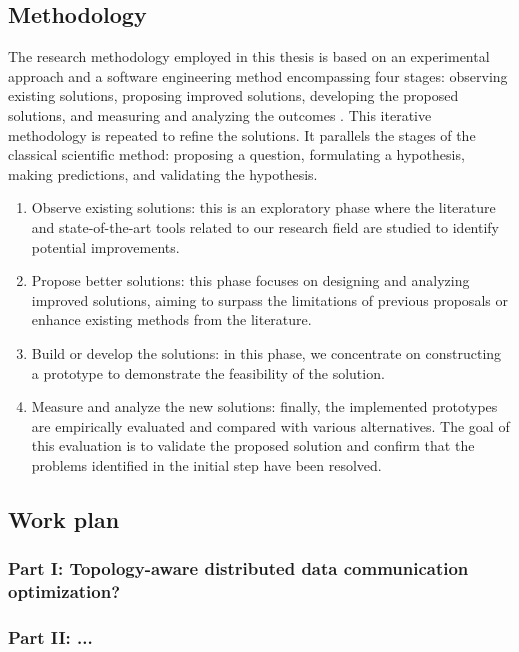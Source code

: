 \documentclass[a4paper, 11pt]{article}
\begin{document}
\subsection{Methodology}
The research methodology employed in this thesis is based on an experimental approach and a software engineering method encompassing four stages: observing existing solutions, proposing improved solutions, developing the proposed solutions, and measuring and analyzing the outcomes \cite{adrion1993research}. This iterative methodology is repeated to refine the solutions. It parallels the stages of the classical scientific method: proposing a question, formulating a hypothesis, making predictions, and validating the hypothesis.

\begin{enumerate}
    \item Observe existing solutions: this is an exploratory phase where the literature and state-of-the-art tools related to our research field are studied to identify potential improvements.
    \item Propose better solutions: this phase focuses on designing and analyzing improved solutions, aiming to surpass the limitations of previous proposals or enhance existing methods from the literature.
    \item Build or develop the solutions: in this phase, we concentrate on constructing a prototype to demonstrate the feasibility of the solution.
    \item Measure and analyze the new solutions: finally, the implemented prototypes are empirically evaluated and compared with various alternatives. The goal of this evaluation is to validate the proposed solution and confirm that the problems identified in the initial step have been resolved.
\end{enumerate}

\subsection{Work plan}
\subsubsection{Part I: Topology-aware distributed data communication optimization?}
\subsubsection{Part II: ...}
\end{document}
